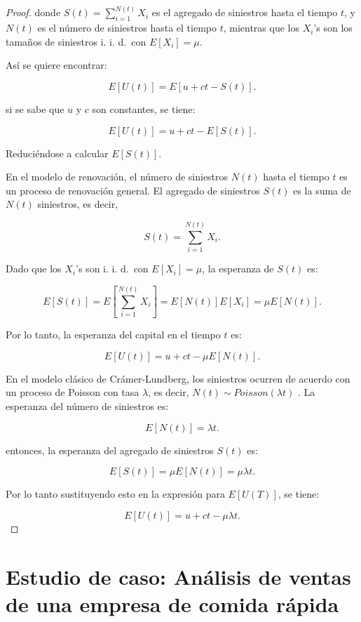 \documentclass[
  us-letterpaper,
]{scrreprt}
\theoremstyle{plain}
\theoremstyle{plain}
\theoremstyle{definition}
\theoremstyle{remark}
\begin{document}
\begin{proof}
donde \(S(t) = \sum_{i=1}^{N(t)} X_i\)\hspace{0pt} es el agregado de
siniestros hasta el tiempo \(t\), y \(N(t)\) es el número de siniestros
hasta el tiempo \(t\), mientras que los \(X_i\)\hspace{0pt}'s son los
tamaños de siniestros i. i. d.~con \(E[X_i] = \mu\).

Así se quiere encontrar:

\[
E[U(t)] = E[u + ct - S(t)].
\]

si se sabe que \(u\) y \(c\) son constantes, se tiene:

\[
E[U(t)] = u + ct - E[S(t)].
\]

Reduciéndose a calcular \(E[S(t)]\).

En el modelo de renovación, el número de siniestros \(N(t)\) hasta el
tiempo \(t\) es un proceso de renovación general. El agregado de
siniestros \(S(t)\) es la suma de \(N(t)\) siniestros, es decir,

\[
S(t) = \sum_{i=1}^{N(t)} X_i.
\]

Dado que los \(X_i\)\hspace{0pt}'s son i. i. d.~con \(E[X_i] = \mu\), la
esperanza de \(S(t)\) es:

\[
E[S(t)] = E \left[\sum_{i=1}^{N(t)} X_i \right] = E[N(t)]E[X_i] = \mu E[N(t)].
\]

Por lo tanto, la esperanza del capital en el tiempo \(t\) es:

\[
E[U(t)] = u + ct - \mu E[N(t)].
\]

En el modelo clásico de Crámer-Lundberg, los siniestros ocurren de
acuerdo con un proceso de Poisson con tasa \(\lambda\), es decir,
\(N(t) \sim Poisson(\lambda t)\) . La esperanza del número de siniestros
es:

\[
E[N(t)] = \lambda t.
\]

entonces, la esperanza del agregado de siniestros \(S(t)\) es:

\[E[S(t)] = \mu E[N(t)] = \mu \lambda t.
\]

Por lo tanto sustituyendo esto en la expresión para \(E[U(T)]\), se
tiene:

\[
E[U(t)] = u +ct - \mu \lambda t.
\]
\end{proof}


\chapter{Estudio de caso: Análisis de ventas de una empresa de comida
rápida}\label{estudio-de-caso-anuxe1lisis-de-ventas-de-una-empresa-de-comida-ruxe1pida}
\end{document}
